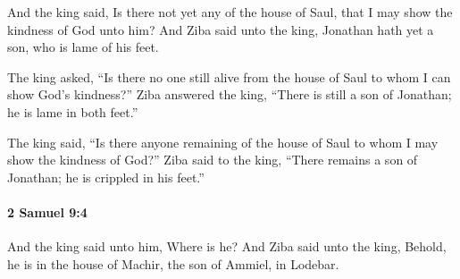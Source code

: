 			\begin{versebox}
					\item[BHS] 
					\item[ASV] And the king said, Is there not yet any of the house of Saul, that I may show the kindness of God unto him? And Ziba said unto the king, Jonathan hath yet a son, who is lame of his feet.
					\item[NIV] The king asked, “Is there no one still alive from the house of Saul to whom I can show God’s kindness?” Ziba answered the king, “There is still a son of Jonathan; he is lame in both feet.”
					\item[NRSV] The king said, “Is there anyone remaining of the house of Saul to whom I may show the kindness of God?” Ziba said to the king, “There remains a son of Jonathan; he is crippled in his feet.”
			\end{versebox}

		\paragraph{2 Samuel 9:4} %
			\label{2SAMUEL-9-4}

			And the king said unto him, Where is he? And Ziba said unto the king, Behold, he is in the house of Machir, the son of Ammiel, in Lodebar.

